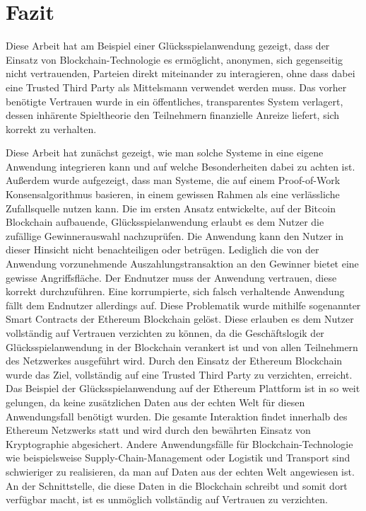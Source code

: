 \chapter{Fazit} %
Diese Arbeit hat am Beispiel einer Glücksspielanwendung gezeigt, dass der Einsatz von Blockchain-Technologie es ermöglicht, anonymen, sich gegenseitig nicht vertrauenden, Parteien direkt miteinander zu interagieren, ohne dass dabei eine Trusted Third Party als Mittelsmann verwendet werden muss. Das vorher benötigte Vertrauen wurde in ein öffentliches, transparentes System verlagert, dessen inhärente Spieltheorie den Teilnehmern finanzielle Anreize liefert, sich korrekt zu verhalten.

Diese Arbeit hat zunächst gezeigt, wie man solche Systeme in eine eigene Anwendung integrieren kann und auf welche Besonderheiten dabei zu achten ist. 
Außerdem wurde aufgezeigt, dass man Systeme, die auf einem Proof-of-Work Konsensalgorithmus basieren, in einem gewissen Rahmen als eine verlässliche Zufallsquelle nutzen kann. Die im ersten Ansatz entwickelte, auf der Bitcoin Blockchain aufbauende, Glücksspielanwendung erlaubt es dem Nutzer die zufällige Gewinnerauswahl nachzuprüfen. Die Anwendung kann den Nutzer in dieser Hinsicht nicht benachteiligen oder betrügen. Lediglich die von der Anwendung vorzunehmende Auszahlungstransaktion an den Gewinner bietet eine gewisse Angriffsfläche. Der Endnutzer muss der Anwendung vertrauen, diese korrekt durchzuführen. Eine korrumpierte, sich falsch verhaltende Anwendung fällt dem Endnutzer allerdings auf. 
Diese Problematik wurde mithilfe sogenannter Smart Contracts der Ethereum Blockchain gelöst. Diese erlauben es dem Nutzer vollständig auf Vertrauen verzichten zu können, da die Geschäftslogik der Glücksspielanwendung in der Blockchain verankert ist und von allen Teilnehmern des Netzwerkes ausgeführt wird. Durch den Einsatz der Ethereum Blockchain wurde das Ziel, vollständig auf eine Trusted Third Party zu verzichten, erreicht.\\

\noindent Das Beispiel der Glücksspielanwendung auf der Ethereum Plattform ist in so weit gelungen, da keine zusätzlichen Daten aus der echten Welt für diesen Anwendungsfall benötigt wurden. Die gesamte Interaktion findet innerhalb des Ethereum Netzwerks statt und wird durch den bewährten Einsatz von Kryptographie abgesichert. Andere Anwendungsfälle für Blockchain-Technologie wie beispielsweise Supply-Chain-Management oder Logistik und Transport sind schwieriger zu realisieren, da man auf Daten aus der echten Welt angewiesen ist. An der Schnittstelle, die diese Daten in die Blockchain schreibt und somit dort verfügbar macht, ist es unmöglich vollständig auf Vertrauen zu verzichten.\\

